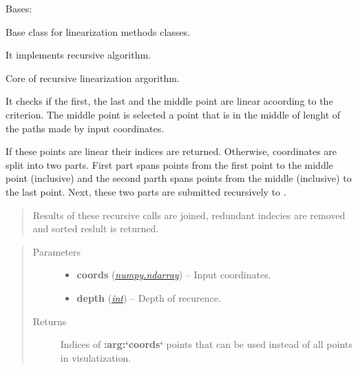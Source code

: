 \documentclass[a4paper,10pt,english]{sphinxmanual}
\begin{document}
\begin{fulllineitems}
\label{aqueduct.geom.traces:aqueduct.geom.traces.LinearizeRecursive}
Bases: \href{http://docs.python.org/2/library/functions.html\#object}{}

Base class for linearization methods classes.

It implements recursive algorithm.

\begin{fulllineitems}
\label{aqueduct.geom.traces:aqueduct.geom.traces.LinearizeRecursive.here}
Core of recursive linearization argorithm.

It checks if the first, the last and the middle point are linear acoording to the criterion. The middle point is selected a point that is in the middle of lenght of the paths made by input coordinates.

If these points are linear their indices are returned. Otherwise, coordinates are split into two parts. First part spans points from the first point to the middle point (inclusive) and the second parth spans points from the middle (inclusive) to the last point. Next, these two parts are submitted recursively to {\hyperref[aqueduct.geom.traces:aqueduct.geom.traces.LinearizeRecursive.here]{}}.
\begin{quote}

Results of these recursive calls are joined, redundant indecies are removed and sorted reslult is returned.
\end{quote}
\begin{quote}\begin{description}
\item[{Parameters}] \leavevmode\begin{itemize}
\item {} 
\textbf{coords} (\href{http://docs.scipy.org/doc/numpy/reference/generated/numpy.ndarray.html\#numpy.ndarray}{\emph{numpy.ndarray}}) -- Input coordinates.

\item {} 
\textbf{depth} (\href{http://docs.python.org/2/library/functions.html\#int}{\emph{int}}) -- Depth of recurence.

\end{itemize}

\item[{Returns}] \leavevmode
Indices of {\color{red}\bfseries{}:arg:{}`coords{}`} points that can be used instead of all points in visulatization.


\end{description}
\end{quote}
\end{fulllineitems}
\end{fulllineitems}
\end{document}
